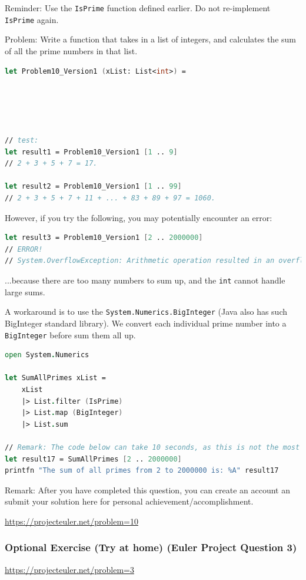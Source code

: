 \documentclass[12pt]{article}
\begin{document}
Reminder: Use the \texttt{IsPrime} function defined earlier. Do not re-implement \texttt{IsPrime} again.

Problem: Write a function that takes in a list of integers, and calculates the sum of all the prime numbers in that list.
\begin{lstlisting}[language=FSharp]
let Problem10_Version1 (xList: List<int>) =





// test:
let result1 = Problem10_Version1 [1 .. 9]
// 2 + 3 + 5 + 7 = 17.

let result2 = Problem10_Version1 [1 .. 99]
// 2 + 3 + 5 + 7 + 11 + ... + 83 + 89 + 97 = 1060.
\end{lstlisting}
However, if you try the following, you may potentially encounter an error:
\begin{lstlisting}[language=FSharp]
let result3 = Problem10_Version1 [2 .. 2000000]
// ERROR!
// System.OverflowException: Arithmetic operation resulted in an overflow.
\end{lstlisting}
...because there are too many numbers to sum up, and the \texttt{int} cannot handle large sums.

A workaround is to use the \texttt{System.Numerics.BigInteger} (Java also has such BigInteger standard library). We convert each individual prime number into a \texttt{BigInteger} before sum them all up.

\begin{lstlisting}[language=FSharp]
open System.Numerics

let SumAllPrimes xList =
    xList
    |> List.filter (IsPrime)
    |> List.map (BigInteger)
    |> List.sum

// Remark: The code below can take 10 seconds, as this is not the most optimal algorithm.
let result17 = SumAllPrimes [2 .. 2000000]
printfn "The sum of all primes from 2 to 2000000 is: %A" result17
\end{lstlisting}
Remark: After you have completed this question, you can create an account an submit your solution here for personal achievement/accomplishment.

\url{https://projecteuler.net/problem=10}

\pagebreak

\subsubsection*{Optional Exercise (Try at home) (Euler Project Question 3)}
\url{https://projecteuler.net/problem=3}
\end{document}
